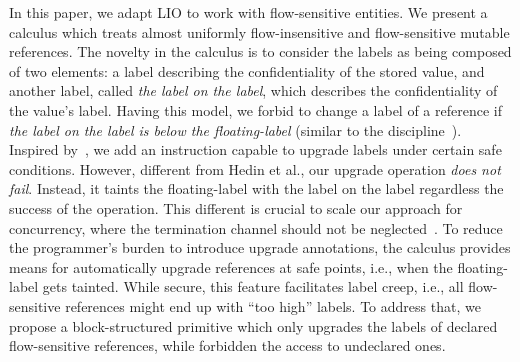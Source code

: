 In this paper, we adapt LIO to work with flow-sensitive entities.  
We present a calculus which treats almost uniformly flow-insensitive and
flow-sensitive mutable references. The novelty in the calculus is to consider
the labels as being composed of two elements: a label describing the
confidentiality of the stored value, and another label, called \emph{the label
  on the label}, which describes the confidentiality of the value's
label. Having this model, we forbid to change a label of a reference if
\emph{the label on the label is below the floating-label} (similar to the {\nsu}
discipline~\citep{Austin:Flanagan:PLAS10}). Inspired by~\citep{Hedin13}, we add
an instruction capable to upgrade labels under certain safe conditions. However,
different from Hedin et al., our upgrade operation \emph{does not
  fail}. Instead, it taints the floating-label with the label on the label
regardless the success of the operation. This different is crucial to scale our
approach for concurrency, where the termination channel should not be
neglected~\citep{stefan:addressing-covert}. To reduce the programmer's burden to
introduce upgrade annotations, the calculus provides means for automatically
upgrade references at safe points, i.e., when the floating-label gets tainted.
While secure, this feature facilitates label creep, i.e., all flow-sensitive
references might end up with ``too high'' labels. To address that, we
propose a block-structured primitive which only upgrades the labels of
declared flow-sensitive references, while forbidden the access to undeclared
ones.
